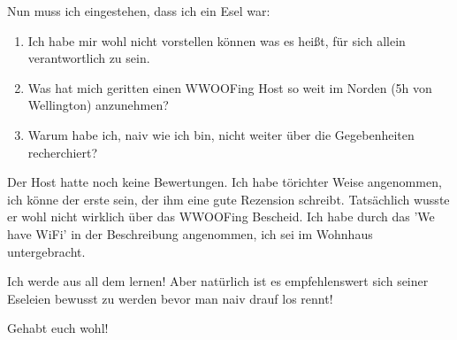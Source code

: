 Nun muss ich eingestehen, dass ich ein Esel war:

\begin{enumerate}
\tightlist
\item
  Ich habe mir wohl nicht vorstellen können was es heißt, für sich
  allein verantwortlich zu sein.
\item
  Was hat mich geritten einen WWOOFing Host so weit im Norden (5h von
  Wellington) anzunehmen?
\item
  Warum habe ich, naiv wie ich bin, nicht weiter über die Gegebenheiten
  recherchiert?
\end{enumerate}

Der Host hatte noch keine Bewertungen. Ich habe törichter Weise
angenommen, ich könne der erste sein, der ihm eine gute Rezension
schreibt. Tatsächlich wusste er wohl nicht wirklich über das WWOOFing
Bescheid. Ich habe durch das 'We have WiFi' in der Beschreibung
angenommen, ich sei im Wohnhaus untergebracht.

Ich werde aus all dem lernen! Aber natürlich ist es empfehlenswert sich
seiner Eseleien bewusst zu werden bevor man naiv drauf los rennt!

Gehabt euch wohl!
